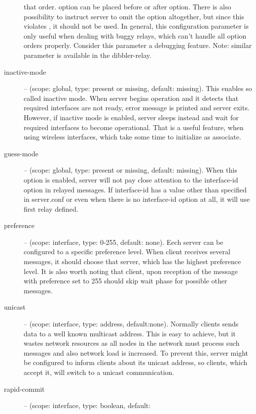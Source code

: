 \begin{description}
        that order.  option can be placed before or after
         option. There is also possibility to instruct
        server to omit the  option altogether, but since 
        this violates \cite{rfc3315}, it should not be used. In general, this
        configuration parameter is only useful when dealing with buggy relays,
        which can't handle all option orders properly. Consider this parameter
        a debugging feature. Note: similar parameter is available in the dibbler-relay.
\item[inactive-mode] -- (scope: global, type: present or missing,
  default: missing). This enables so called inactive mode. When server
  begins operation and it detects that required interfaces are not
  ready, error message is printed and server exits. However, if
  inactive mode is enabled, server sleeps instead and wait for
  required interfaces to become operational. That is a useful feature,
  when using wireless interfaces, which take some time to initialize
  as associate.
\item[guess-mode] -- (scope: global, type: present or missing,
  default: missing). When this option is enabled, server will not pay
  close attention to the interface-id option in relayed messages. If
  interface-id has a value other than specified in server.conf or even
  when there is no interface-id option at all, it will use first relay
  defined.
 \item[preference] -- (scope: interface, type: 0-255, default:
	    none). Eech server can be configured to a specific
	    preference level. When client receives several
	     messages, it should choose that server,
	    which has the highest preference level. It is also worth
	    noting that client, upon reception of the 
	    message with preference set to 255 should skip wait phase
	    for possible other  messages.
 \item[unicast] -- (scope: interface, type: address,
	    default:none). Normally clients sends data to a well known
	    multicast address. This is easy to achieve, but it wastes
	    network resources as all nodes in the network must process
	    such messages and also network load is increased. To prevent
	    this, server might be configured to inform clients about its
	    unicast address, so clients, which accept it, will switch to
	    a unicast communication.
 \item[rapid-commit] -- (scope: interface, type: boolean, default:

\end{description}
